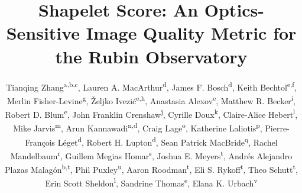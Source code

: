 \documentclass[]{spie}
\providecommand{\supit}[1]{\textsuperscript{#1}}
\begin{document}
\title{Shapelet Score: An Optics-Sensitive Image Quality Metric for the
Rubin Observatory}





\author{%
Tianqing Zhang\supit{a,b,c}, Lauren A. MacArthur\supit{d}, James F. Bosch\supit{d},
Keith Bechtol\supit{e,f}, Merlin Fisher-Levine\supit{g}, \v{Z}eljko Ivezi\'{c}\supit{e,h},
Anastasia Alexov\supit{e}, Matthew R. Becker\supit{i}, Robert D. Blum\supit{e},
John Franklin Crenshaw\supit{j}, Cyrille Doux\supit{k}, Claire-Alice Hebert\supit{l},
Mike Jarvis\supit{m}, Arun Kannawadi\supit{n,d}, Craig Lage\supit{o},
Katherine Laliotis\supit{p}, Pierre-Fran\c{c}ois L\'{e}get\supit{d}, Robert H. Lupton\supit{d},
Sean Patrick MacBride\supit{q}, Rachel Mandelbaum\supit{r}, Guillem Megias Homar\supit{s},
Joshua E. Meyers\supit{t}, Andr\'{e}s Alejandro Plazas Malag\'{o}n\supit{b,t}, Phil Puxley\supit{u},
Aaron Roodman\supit{t}, Eli S. Rykoff\supit{t}, Theo Schutt\supit{t}, Erin Scott Sheldon\supit{l},
Sandrine Thomas\supit{e}, Elana K. Urbach\supit{v}%
}




\maketitle
\end{document}
